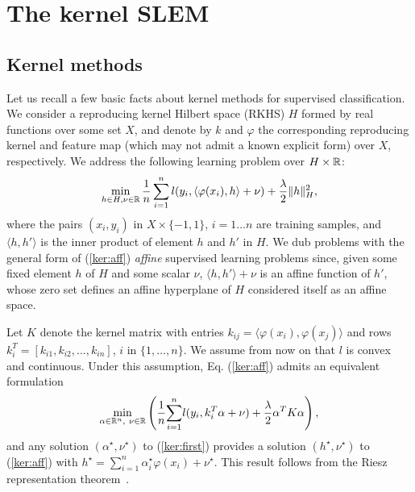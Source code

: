 \section{The kernel SLEM}
\label{nonlinear SLEM}

\subsection{Kernel methods}\label{kernel:review}
Let us recall a few basic facts about kernel methods for supervised
classification. We consider a reproducing kernel Hilbert space (RKHS)
$H$ formed by real functions over some set
$X$, and denote by $k$ and $\varphi$ the corresponding reproducing kernel and feature map (which may not admit a known explicit form) over $X$, respectively. We
address the following learning problem over $H\times\mathbb R$:
\begin{equation}
\min_{h\in H,\nu\in\mathbb R}
\dfrac{1}{n}\sum_{i=1}^n l(y_i,\langle \varphi(x_i),h\rangle+\nu) +
\dfrac{\lambda}{2}\|h\|_H^2,
\label{ker:aff}
\end{equation} 
where the pairs $(x_i,y_i)$ in $X\times \{-1,1\}$, $i=1\dots n$ are training samples, %
and $\langle h, h' \rangle$ is the inner product of element $h$ and $h'$ in $H$. We dub problems with the general form of (\ref{ker:aff}) {\em affine}
supervised learning problems since, given some fixed element $h$ of
$H$ and some scalar $\nu$, $\langle h,h'\rangle+\nu$ is an affine function of $h'$,
whose zero set defines an affine hyperplane of $H$ considered itself
as an affine space.

Let $K$ denote the kernel matrix with entries $k_{ij}=\langle\varphi(x_i),
\varphi(x_j)\rangle$ and rows $k_i^T=[k_{i1}, k_{i2},...,k_{in}]$, $i$ in $\{1,\ldots,n\}$.  We assume from now on that $l$ is convex and continuous. Under this assumption, Eq. (\ref{ker:aff}) admits an equivalent formulation
\begin{align}
\min_{\alpha\in\mathbb R^{n}, \ \nu\in\mathbb R} \left(\dfrac{1}{n}\displaystyle{\sum_{i=1}^n} l(y_i, k_i^T\alpha+\nu)  +\dfrac{\lambda}{2}\alpha^TK\alpha\right), \label{ker:first}
\end{align}
and any solution $(\alpha^\star,\nu^\star)$ to (\ref{ker:first})
provides
a solution $(h^\star,\nu^\star)$ to (\ref{ker:aff}) with
$h^\star=\sum_{i=1}^n \alpha_i^\star\varphi(x_i)+\nu^\star$. This result follows from the Riesz representation theorem~\cite{SHS01,Wahba90}.


